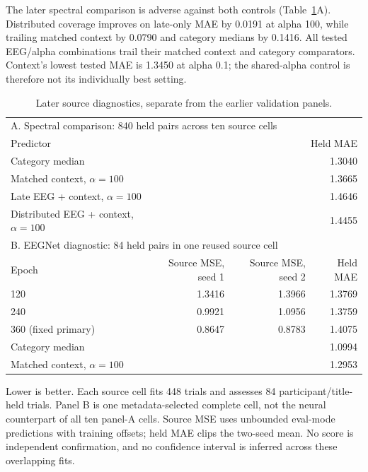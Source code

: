 \documentclass[10pt,letterpaper]{article}
\begin{document}
The later spectral comparison is adverse against both controls (Table~\ref{tab:sourcefollowup}A). Distributed coverage improves on late-only MAE by 0.0191 at alpha 100, while trailing matched context by 0.0790 and category medians by 0.1416. All tested EEG/alpha combinations trail their matched context and category comparators. Context's lowest tested MAE is 1.3450 at alpha 0.1; the shared-alpha control is therefore not its individually best setting.

\begin{table}[!htbp]
\centering\small
\caption{Later source diagnostics, separate from the earlier validation panels.}
\label{tab:sourcefollowup}
\begin{tabular}{lrrr}
\toprule
\multicolumn{4}{l}{A. Spectral comparison: 840 held pairs across ten source cells}\\
Predictor & \multicolumn{3}{r}{Held MAE}\\
\midrule
Category median & \multicolumn{3}{r}{1.3040}\\
Matched context, $\alpha=100$ & \multicolumn{3}{r}{1.3665}\\
Late EEG + context, $\alpha=100$ & \multicolumn{3}{r}{1.4646}\\
Distributed EEG + context, $\alpha=100$ & \multicolumn{3}{r}{1.4455}\\
\midrule
\multicolumn{4}{l}{B. EEGNet diagnostic: 84 held pairs in one reused source cell}\\
Epoch & Source MSE, seed 1 & Source MSE, seed 2 & Held MAE\\
\midrule
120 & 1.3416 & 1.3966 & 1.3769\\
240 & 0.9921 & 1.0956 & 1.3759\\
360 (fixed primary) & 0.8647 & 0.8783 & 1.4075\\
\midrule
Category median & \multicolumn{3}{r}{1.0994}\\
Matched context, $\alpha=100$ & \multicolumn{3}{r}{1.2953}\\
\bottomrule
\end{tabular}
\par\medskip\begin{minipage}{0.97\linewidth}\footnotesize Lower is better. Each source cell fits 448 trials and assesses 84 participant/title-held trials. Panel B is one metadata-selected complete cell, not the neural counterpart of all ten panel-A cells. Source MSE uses unbounded eval-mode predictions with training offsets; held MAE clips the two-seed mean. No score is independent confirmation, and no confidence interval is inferred across these overlapping fits.\end{minipage}
\end{table}
\end{document}
